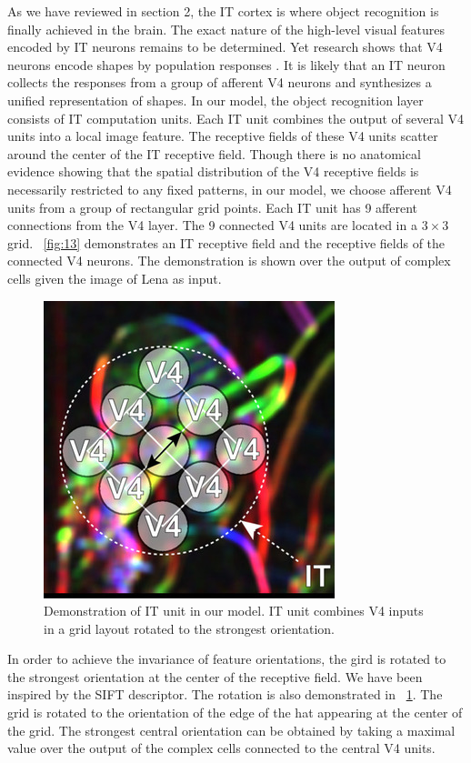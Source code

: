 \documentclass[9pt,twocolumn]{article}
\begin{document}
As we have reviewed in section 2,
the IT cortex is where object recognition is finally achieved in the brain.
The exact nature of the high-level visual features 
encoded by IT neurons remains to be determined.
Yet research shows that V4 neurons encode shapes by population responses \cite{pasupathy2002}.
It is likely that an IT neuron collects the responses from a group of afferent V4 neurons 
and synthesizes a unified representation of shapes.
In our model, the object recognition layer consists of IT computation units.
Each IT unit combines the output of several V4 units into a local image feature.
The receptive fields of these V4 units scatter around the center of the IT receptive field.
Though there is no anatomical evidence showing that 
the spatial distribution of the V4 receptive fields 
is necessarily restricted to any fixed patterns,
in our model, we choose afferent V4 units from a group of rectangular grid points.
Each IT unit has 9 afferent connections from the V4 layer.
The 9 connected V4 units are located in a $3\times 3$ grid.
\figurename~\ref{fig:13} demonstrates an IT receptive field 
and the receptive fields of the connected V4 neurons.
The demonstration is shown over
the output of complex cells given the image of Lena as input.

\begin{figure}
\centering
\includegraphics[width=0.5\linewidth]{images/fig-14.jpg}
\caption{Demonstration of IT unit in our model. 
IT unit combines V4 inputs in a grid layout rotated to the strongest orientation.}
\label{fig:14}
\end{figure}

In order to achieve the invariance of feature orientations,
the gird is rotated to the strongest orientation at the center of the receptive field.
We have been inspired by the SIFT \cite{lowe1999} descriptor.
The rotation is also demonstrated in \figurename~\ref{fig:14}.
The grid is rotated to the orientation of the edge of the hat appearing at the center of the grid.
The strongest central orientation can be obtained by taking a maximal value 
over the output of the complex cells connected to the central V4 units.
\end{document}
